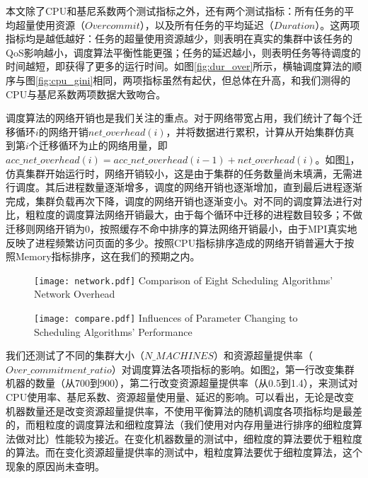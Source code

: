 本文除了CPU和基尼系数两个测试指标之外，还有两个测试指标：所有任务的平均超量使用资源（$Overcommit$），以及所有任务的平均延迟（$Duration$）。这两项指标均是越低越好：任务的超量使用资源越少，则表明在真实的集群中该任务的QoS影响越小，调度算法平衡性能更强；任务的延迟越小，则表明任务等待调度的时间越短，即获得了更多的运行时间。如图\ref{fig:dur_over}所示，横轴调度算法的顺序与图\ref{fig:cpu_gini}相同，两项指标虽然有起伏，但总体在升高，和我们测得的CPU与基尼系数两项数据大致吻合。

调度算法的网络开销也是我们关注的重点。对于网络带宽占用，我们统计了每个迁移循环$i$的网络开销$net\_overhead(i)$，并将数据进行累积，计算从开始集群仿真到第$i$个迁移循环为止的网络用量，即$acc\_net\_overhead(i)=acc\_net\_overhead(i-1)+net\_overhead(i)$。如图\ref{fig:minetwork}，仿真集群开始运行时，网络开销较小，这是由于集群的任务数量尚未填满，无需进行调度。其后进程数量逐渐增多，调度的网络开销也逐渐增加，直到最后进程逐渐完成，集群负载再次下降，调度的网络开销也逐渐变小。对不同的调度算法进行对比，粗粒度的调度算法网络开销最大，由于每个循环中迁移的进程数目较多；不做迁移则网络开销为0，按照缓存不命中排序的算法网络开销最小，由于MPI真实地反映了进程频繁访问页面的多少。按照CPU指标排序造成的网络开销普遍大于按照Memory指标排序，这在我们的预期之内。
\begin{figure}[!htp]
  \centering
  \texttt{[image: network.pdf]}
    {Comparison of Eight Scheduling Algorithms' Network Overhead}
  \label{fig:minetwork}
\end{figure}

\begin{figure}[!htp]
  \centering
  \texttt{[image: compare.pdf]}
    {Influences of Parameter Changing to Scheduling Algorithms' Performance}
  \label{fig:comparing}
\end{figure}

我们还测试了不同的集群大小（$N\_MACHINES$）和资源超量提供率（$Over\_commitment\_ratio$）对调度算法各项指标的影响。如图\ref{fig:comparing}，第一行改变集群机器的数量（从700到900），第二行改变资源超量提供率（从0.5到1.4），来测试对CPU使用率、基尼系数、资源超量使用量、延迟的影响。可以看出，无论是改变机器数量还是改变资源超量提供率，不使用平衡算法的随机调度各项指标均是最差的，而粗粒度的调度算法和细粒度算法（我们使用对内存用量进行排序的细粒度算法做对比）性能较为接近。在变化机器数量的测试中，细粒度的算法要优于粗粒度的算法。而在变化资源超量提供率的测试中，粗粒度算法要优于细粒度算法，这个现象的原因尚未查明。

